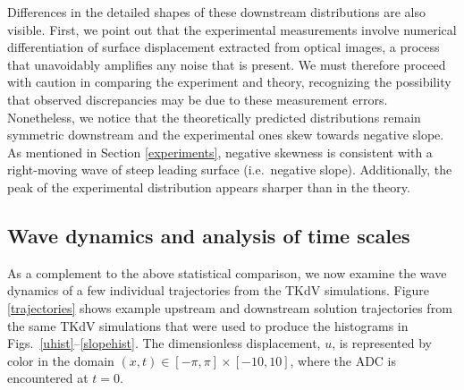\documentclass[11pt]{article}
\begin{document}
	Differences in the detailed shapes of these downstream distributions are also visible. First, we point out that the experimental measurements involve numerical differentiation of  surface displacement extracted from optical images, a process that unavoidably amplifies any noise that is present. We must therefore proceed with caution in comparing the experiment and theory, recognizing the possibility that observed discrepancies may be due to these measurement errors. Nonetheless, we notice that the theoretically predicted distributions remain symmetric downstream and the experimental ones skew towards negative slope. As mentioned in Section \ref{experiments}, negative skewness is consistent with a right-moving wave of steep leading surface (i.e.~negative slope). Additionally, the peak of the experimental distribution appears sharper than in the theory.



\subsection{Wave dynamics and analysis of time scales}

	As a complement to the above statistical comparison, we now examine the wave dynamics of a few individual trajectories from the TKdV simulations. Figure \ref{trajectories} shows example upstream and downstream solution trajectories from the same TKdV simulations that were used to produce the histograms in Figs.~\ref{uhist}--\ref{slopehist}. The dimensionless displacement, $u$, is represented by color in the domain $(x,t) \in [-\pi,\pi] \times [-10,10]$, where the ADC is encountered at $t=0$. 
	
\end{document}
